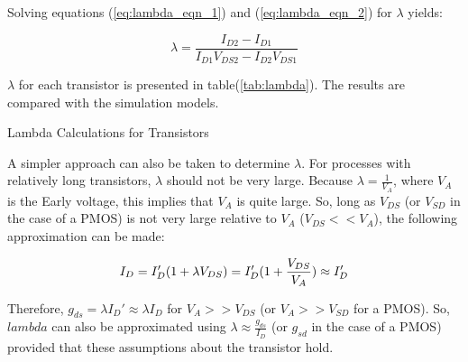 Solving equations (\ref{eq:lambda_eqn_1}) and (\ref{eq:lambda_eqn_2}) for $\lambda$ yields:

\begin{equation}
	\label{eq:lambda_solved}
	\lambda = \frac{ I_{D2} - I_{D1} }{ I_{D1} V_{DS2} - I_{D2} V_{DS1} }
\end{equation}

$\lambda$ for each transistor is presented in table(\ref{tab:lambda}).
The results are compared with the simulation models.

\FloatBarrier

\begin{table}[h!]
	\centering
	\caption{Lambda Calculations for Transistors}
	\label{tab:lambda}
\end{table}

\FloatBarrier

A simpler approach can also be taken to determine $\lambda$.
For processes with relatively long transistors, $\lambda$ should not be very large.
Because $\lambda = \frac{1}{V_{A}}$, where $V_{A}$ is the Early voltage, this implies that $V_{A}$ is quite large.
So, long as $V_{DS}$ (or $V_{SD}$ in the case of a PMOS) is not very large relative to $V_{A}$ ($V_{DS} << V_{A}$), the following approximation can be made:

\begin{equation}
	\label{eq:approx_lambda}
	I_{D} = I_{D}' ( 1 + \lambda V_{DS} ) \\
	= I_{D}' ( 1 + \frac{V_{DS}}{V_{A}} ) \\
	\approx I_{D}'
\end{equation}

Therefore, $g_{ds} = \lambda I_{D}' \approx \lambda I_{D}$ for $V_{A} >> V_{DS}$ (or $V_{A} >> V_{SD}$ for a PMOS).
So, $lambda$ can also be approximated using $\lambda \approx \frac{g_{ds}}{I_{D}}$ (or $g_{sd}$ in the case of a PMOS) provided that these assumptions about the transistor hold.
